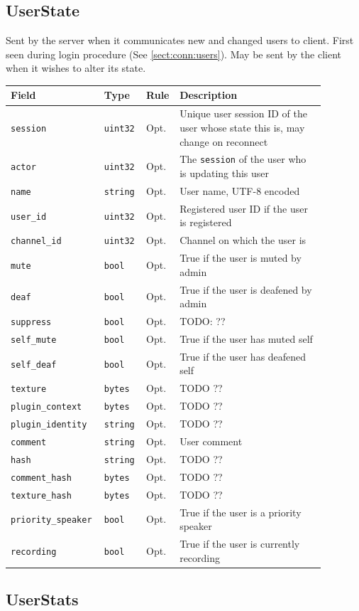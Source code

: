 \documentclass[11pt]{article} %
\newenvironment{mumbleMessageEx}
{%
	\small
	\renewcommand\arraystretch{1.5}
	\begin{tabular}{p{0.25\linewidth}p{0.13\linewidth}p{0.05\linewidth}p{0.45\linewidth}}
	Field & Type & Rule & Description \\
	\hline
}
{%
	\end{tabular}
	\renewcommand\arraystretch{1.0}
}
\newcommand{\mumbleMessageExItem}[4]{ \texttt{#1} & \texttt{#2} & #3 & #4 \\ }
\begin{document}
\subsection{UserState}
\label{msg:userState}

Sent by the server when it communicates new and changed users to client. First seen during login procedure (See \ref{sect:conn:users}). May be sent by the client when it wishes to alter its state.

\begin{mumbleMessageEx}
\mumbleMessageExItem{session}{uint32}{Opt.}{Unique user session ID of the user whose state this is, may change on reconnect}
\mumbleMessageExItem{actor}{uint32}{Opt.}{The \texttt{session} of the user who is updating this user}
\mumbleMessageExItem{name}{string}{Opt.}{User name, UTF-8 encoded}
\mumbleMessageExItem{user\_id}{uint32}{Opt.}{Registered user ID if the user is registered}
\mumbleMessageExItem{channel\_id}{uint32}{Opt.}{Channel on which the user is}
\mumbleMessageExItem{mute}{bool}{Opt.}{True if the user is muted by admin}
\mumbleMessageExItem{deaf}{bool}{Opt.}{True if the user is deafened by admin}
\mumbleMessageExItem{suppress}{bool}{Opt.}{TODO: ??}
\mumbleMessageExItem{self\_mute}{bool}{Opt.}{True if the user has muted self}
\mumbleMessageExItem{self\_deaf}{bool}{Opt.}{True if the user has deafened self}
\mumbleMessageExItem{texture}{bytes}{Opt.}{TODO ??}
\mumbleMessageExItem{plugin\_context}{bytes}{Opt.}{TODO ??}
\mumbleMessageExItem{plugin\_identity}{string}{Opt.}{TODO ??}
\mumbleMessageExItem{comment}{string}{Opt.}{User comment}
\mumbleMessageExItem{hash}{string}{Opt.}{TODO ??}
\mumbleMessageExItem{comment\_hash}{bytes}{Opt.}{TODO ??}
\mumbleMessageExItem{texture\_hash}{bytes}{Opt.}{TODO ??}
\mumbleMessageExItem{priority\_speaker}{bool}{Opt.}{True if the user is a priority speaker}
\mumbleMessageExItem{recording}{bool}{Opt.}{True if the user is currently recording}
\end{mumbleMessageEx}

\subsection{UserStats}
\label{msg:userStats}
\end{document}
